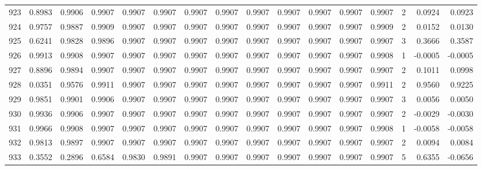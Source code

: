 \begin{tabular}{lrrrrrrrrrrrrrrr}
923 &      0.8983 &  0.9906 &  0.9907 &  0.9907 &  0.9907 &  0.9907 &  0.9907 &  0.9907 &  0.9907 &  0.9907 &   0.9907 &     0.9907 &      2 &                    0.0924 &                     0.0923 \\
924 &      0.9757 &  0.9887 &  0.9909 &  0.9907 &  0.9907 &  0.9907 &  0.9907 &  0.9907 &  0.9907 &  0.9907 &   0.9907 &     0.9909 &      2 &                    0.0152 &                     0.0130 \\
925 &      0.6241 &  0.9828 &  0.9896 &  0.9907 &  0.9907 &  0.9907 &  0.9907 &  0.9907 &  0.9907 &  0.9907 &   0.9907 &     0.9907 &      3 &                    0.3666 &                     0.3587 \\
926 &      0.9913 &  0.9908 &  0.9907 &  0.9907 &  0.9907 &  0.9907 &  0.9907 &  0.9907 &  0.9907 &  0.9907 &   0.9907 &     0.9908 &      1 &                   -0.0005 &                    -0.0005 \\
927 &      0.8896 &  0.9894 &  0.9907 &  0.9907 &  0.9907 &  0.9907 &  0.9907 &  0.9907 &  0.9907 &  0.9907 &   0.9907 &     0.9907 &      2 &                    0.1011 &                     0.0998 \\
928 &      0.0351 &  0.9576 &  0.9911 &  0.9907 &  0.9907 &  0.9907 &  0.9907 &  0.9907 &  0.9907 &  0.9907 &   0.9907 &     0.9911 &      2 &                    0.9560 &                     0.9225 \\
929 &      0.9851 &  0.9901 &  0.9906 &  0.9907 &  0.9907 &  0.9907 &  0.9907 &  0.9907 &  0.9907 &  0.9907 &   0.9907 &     0.9907 &      3 &                    0.0056 &                     0.0050 \\
930 &      0.9936 &  0.9906 &  0.9907 &  0.9907 &  0.9907 &  0.9907 &  0.9907 &  0.9907 &  0.9907 &  0.9907 &   0.9907 &     0.9907 &      2 &                   -0.0029 &                    -0.0030 \\
931 &      0.9966 &  0.9908 &  0.9907 &  0.9907 &  0.9907 &  0.9907 &  0.9907 &  0.9907 &  0.9907 &  0.9907 &   0.9907 &     0.9908 &      1 &                   -0.0058 &                    -0.0058 \\
932 &      0.9813 &  0.9897 &  0.9907 &  0.9907 &  0.9907 &  0.9907 &  0.9907 &  0.9907 &  0.9907 &  0.9907 &   0.9907 &     0.9907 &      2 &                    0.0094 &                     0.0084 \\
933 &      0.3552 &  0.2896 &  0.6584 &  0.9830 &  0.9891 &  0.9907 &  0.9907 &  0.9907 &  0.9907 &  0.9907 &   0.9907 &     0.9907 &      5 &                    0.6355 &                    -0.0656 \\

\end{tabular}

